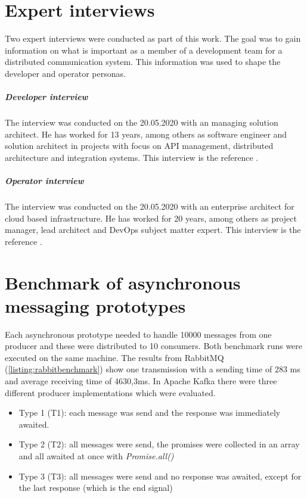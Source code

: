 
\addchap{\langanhang}

\chapter{Expert interviews}
\label{chp:appendix:interview}

Two expert interviews were conducted as part of this work.
The goal was to gain information on what is important as a member of a development team for a  distributed communication system.
This information was used to shape the developer and operator personas.

\paragraph{Developer interview}

The interview was conducted on the 20.05.2020 with an managing solution architect.
He has worked for 13 years, among others as software engineer and solution architect in projects with focus on API management, distributed architecture and integration systems.
This interview is the reference \cite{ManagingSolutionArchitect.20.05.2020}.

\paragraph{Operator interview}

The interview was conducted on the 20.05.2020 with an enterprise architect for cloud based infrastructure.
He has worked for 20 years, among others as project manager, lead architect and DevOps subject matter expert.
This interview is the reference \cite{EnterpriseArchitectforcloudbasedinfrastructure.20.05.2020}.

\pagebreak

\chapter{Benchmark of asynchronous messaging prototypes}
\label{chp:appendix:benchmark}

Each asynchronous prototype needed to handle 10000 messages from one producer and these were distributed to 10 consumers.
Both benchmark runs were executed on the same machine.
The results from RabbitMQ (\ref{listing:rabbitbenchmark}) show one transmission with a sending time of 283 ms and average receiving time of 4630,3ms.
In Apache Kafka there were three different producer implementations which were evaluated.
\begin{itemize}
    \item Type 1 (T1): each message was send and the response was immediately awaited.
    \item Type 2 (T2): all messages were send, the promises were collected in an array and all awaited at once with \textit{Promise.all()}
    \item Type 3 (T3): all messages were send and no response was awaited, except for the last response (which is the end signal)
\end{itemize}


